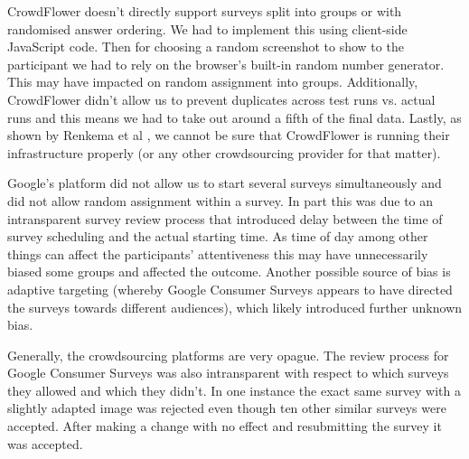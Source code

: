\documentclass[twoside,letterpaper]{soups}
\begin{document}
CrowdFlower doesn't directly support surveys split into groups or with randomised answer ordering. We had to implement this using client-side JavaScript code. Then for choosing a random screenshot to show to the participant we had to rely on the browser's built-in random number generator. This may have impacted on random assignment into groups. %
Additionally, CrowdFlower didn't allow us to prevent duplicates across test runs vs. actual runs and this means we had to take out around a fifth of the final data.
Lastly, as shown by Renkema et al \cite{renkema2014buildling}, we cannot be sure that CrowdFlower is running their infrastructure properly (or any other crowdsourcing provider for that matter).

Google's platform did not allow us to start several surveys simultaneously and did not allow random assignment within a survey. %
In part this was due to an intransparent survey review process that introduced delay between the time of survey scheduling and the actual starting time. As time of day among other things can affect the participants' attentiveness this may have unnecessarily biased some groups and affected the outcome. Another possible source of bias is adaptive targeting (whereby Google Consumer Surveys appears to have directed the surveys towards different audiences), which likely introduced further unknown bias. %

Generally, the crowdsourcing platforms are very opague. The review process for Google Consumer Surveys was also intransparent with respect to which surveys they allowed and which they didn't. In one instance the exact same survey with a slightly adapted image was rejected even though ten other similar surveys were accepted. After making a change with no effect and resubmitting the survey it was accepted.






\end{document}
